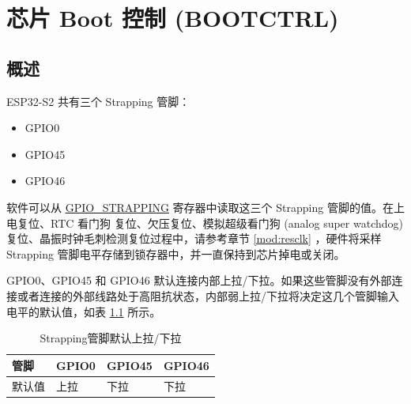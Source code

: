 \documentclass[main\_\_CN.tex]{subfiles}
\begin{document}
\setchineseformatting

\ifglobal
\else
    \listoftodos
    {\let\clearpage\relax \listofdonetodos}
    \tableofcontents
\fi




\hypertarget{bootctrl}{}
\chapter{芯片 Boot 控制 (BOOTCTRL)}
\label{mod:bootctrl}


\section{概述}

ESP32-S2 共有三个 Strapping 管脚：
\begin{itemize}
    \item GPIO0
    \item GPIO45
    \item GPIO46
\end{itemize}

软件可以从 \hyperref[fielddesc:GPIOSTRAPPING]{GPIO\_STRAPPING} 寄存器中读取这三个 Strapping 管脚的值。在上电复位、RTC 看门狗 复位、欠压复位、模拟超级看门狗 (analog super watchdog) 复位、晶振时钟毛刺检测复位过程中，请参考章节 \ref{mod:resclk} \textit{}，硬件将采样 Strapping 管脚电平存储到锁存器中，并一直保持到芯片掉电或关闭。

GPIO0、GPIO45 和 GPIO46 默认连接内部上拉/下拉。如果这些管脚没有外部连接或者连接的外部线路处于高阻抗状态，内部弱上拉/下拉将决定这几个管脚输入电平的默认值，如表 \ref{table:pull_up_down} 所示。

\begin{longtable}[c]{|p{2.5cm}|p{2.5cm}|p{2.5cm}|p{2.5cm}|}
\caption{Strapping管脚默认上拉/下拉}
\label{table:pull_up_down} \\
    \hline
    \rowcolor{lightgray}
  管脚 & GPIO0 & GPIO45 & GPIO46 \\ \hline
  默认值 & 上拉 & 下拉 & 下拉 \\ \hline
  \hline
\end{longtable}
\end{document}
